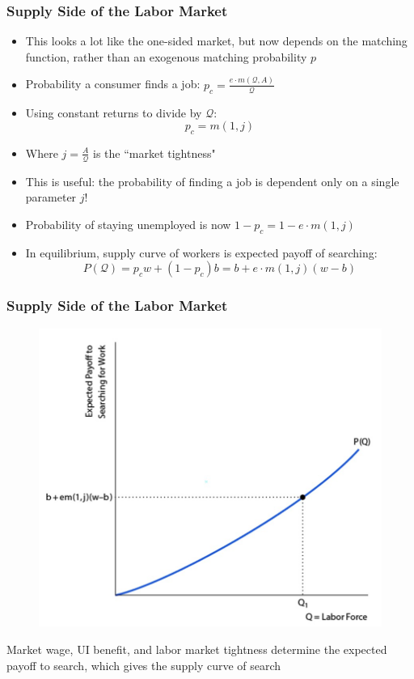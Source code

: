 \documentclass{beamer}
\begin{document}
\begin{frame}
\frametitle[alignment=center]{Supply Side of the Labor Market}
\begin{itemize}
\item This looks a lot like the one-sided market, but now depends on the matching function, rather than an exogenous matching probability $p$
\bigskip
\item Probability a consumer finds a job: $p_c=\frac{e\cdot m(\mathcal{Q},A)}{\mathcal{Q}}$
\bigskip
\item Using constant returns to divide by $\mathcal{Q}$:
$$p_c=m(1,j)$$
\item Where $j=\frac{A}{\mathcal{Q}}$ is the ``market tightness"
\bigskip
\item This is useful:  the probability of finding a job is dependent only on a single parameter $j$!
\bigskip
\item Probability of staying unemployed is now $1-p_c=1-e\cdot m(1,j)$
\bigskip
\item In equilibrium, supply curve of workers is expected payoff of searching:
$$P(\mathcal{Q})=p_cw+(1-p_c)b=b+e\cdot m(1,j)(w-b)$$
\end{itemize}
\end{frame}
 
\begin{frame}
\frametitle[alignment=center]{Supply Side of the Labor Market}
\begin{figure}
\centering
\includegraphics[scale=0.5]{Figures/W_Fig_6pt18.png}
\end{figure}
Market wage, UI benefit, and labor market tightness determine the expected payoff to search, which gives the supply curve of search
\end{frame}
\end{document}
